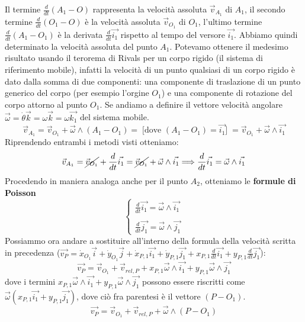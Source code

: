 Il termine $\frac{d}{dt}(A_1-O)$ rappresenta la velocità assoluta $\vec{v}_{A_1}$ di $A_1$, il secondo termine $\frac{d}{dt}(O_1 - O)$ è la velocità assoluta $\vec{v}_{O_1}$ di $O_1$, l'ultimo termine $\frac{d}{dt}(A_1 -O_1)$ è la derivata $\frac{d}{dt}\vec{i_1}$ rispetto al tempo del versore $\vec{i_1}$. Abbiamo quindi determinato la velocità assoluta del punto $A_1$.\newline
Potevamo ottenere il medesimo risultato usando il terorema di Rivals per un corpo rigido (il sistema di riferimento mobile), infatti la velocità di un punto qualsiasi di un corpo rigido è dato dalla somma di due componenti: una componente di traslazione di un punto generico del corpo (per esempio l'orgine $O_1$) e una componente di rotazione del corpo attorno al punto $O_1$. Se andiamo a definire il vettore velocità angolare $\vec{\omega} = \dot{\theta} \vec{k} = \omega \vec{k} = \omega \vec{k_1}$ del sistema mobile.
\[
    \vec{v}_{A_1} = \vec{v}_{O_1} + \vec{\omega} \land (A_1 - O_1) =\;\text{[dove $(A_1 - O_1) = \vec{i_1}$]}\; = \vec{v}_{O_1} + \vec{\omega}\land \vec{i_1}
\]
\newline
Riprendendo entrambi i metodi visti otteniamo:
\[
    \vec{v}_{A_1} = \cancel{\vec{v}_{O_1}} + \frac{d}{dt}\vec{i_1} = \cancel{\vec{v}_{O_1}} + \vec{\omega} \land \vec{i_1} \Longrightarrow \frac{d}{dt}\vec{i_1} = \vec{\omega}\land \vec{i_1}
\]
Procedendo in maniera analoga anche per il punto $A_2$, otteniamo le \textbf{formule di Poisson}
\[
    \begin{cases}
        \frac{d}{dt}\vec{i_1} = \vec{\omega}\land \vec{i_1}\\
        \\
        \frac{d}{dt}\vec{j_1} = \vec{\omega}\land \vec{j_1}
    \end{cases}
\]
Possiammo ora andare a sostituire all'interno della formula della velocità scritta in precedenza ($
    \vec{v_P} = 
        \dot{x}_{O_1}\vec{i} + 
        \dot{y}_{O_1} \vec{j} + 
        \dot{x}_{P,1} \vec{i_1} + 
        \dot{y}_{P,1} \vec{j_1} + 
        x_{P,1} \frac{d}{dt}\vec{i_1} + 
        y_{P,1} \frac{d}{dt} \vec{j_1}
$):
\[
    \vec{v_P} = 
        \vec{v}_{O_1} + \vec{v}_{rel, P} +
        x_{P,1} \vec{\omega}\land \vec{i_1} + 
        y_{P,1} \vec{\omega}\land \vec{j_1}
\]
dove i termini $x_{P,1} \vec{\omega}\land \vec{i_1} + y_{P,1} \vec{\omega}\land \vec{j_1}$ possono essere riscritti come $\vec{\omega}(x_{P,1} \vec{i_1} + y_{P,1} \vec{j_1})$, dove ciò fra parentesi è il vettore $(P-O_1)$.
\[
    \vec{v_P} = 
        \vec{v}_{O_1} + \vec{v}_{rel, P} + \vec{\omega} \land (P-O_1)
\]